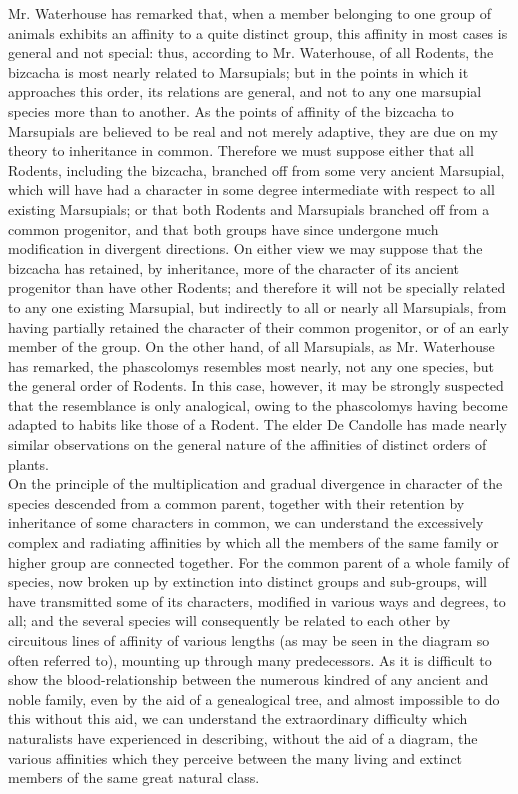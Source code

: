 \indent Mr. Waterhouse has remarked that, when a member belonging to one group of animals exhibits an affinity to a quite distinct group, this affinity in most cases is general and not special: thus, according to Mr. Waterhouse, of all Rodents, the bizcacha is most nearly related to Marsupials; but in the points in which it approaches this order, its relations are general, and not to any one marsupial species more than to another. As the points of affinity of the bizcacha to Marsupials are believed to be real and not merely adaptive, they are due on my theory to inheritance in common. Therefore we must suppose either that all Rodents, including the bizcacha, branched off from some very ancient Marsupial, which will have had a character in some degree intermediate with respect to all existing Marsupials; or that both Rodents and Marsupials branched off from a common progenitor, and that both groups have since undergone much modification in divergent directions. On either view we may suppose that the bizcacha has retained, by inheritance, more of the character of its ancient progenitor than have other Rodents; and therefore it will not be specially related to any one existing Marsupial, but indirectly to all or nearly all Marsupials, from having partially retained the character of their common progenitor, or of an early member of the group. On the other hand, of all Marsupials, as Mr. Waterhouse has remarked, the phascolomys resembles most nearly, not any one species, but the general order of Rodents. In this case, however, it may be strongly suspected that the resemblance is only analogical, owing to the phascolomys having become adapted to habits like those of a Rodent. The elder De Candolle has made nearly similar observations on the general nature of the affinities of distinct orders of plants.~\\
\indent On the principle of the multiplication and gradual divergence in character of the species descended from a common parent, together with their retention by inheritance of some characters in common, we can understand the excessively complex and radiating affinities by which all the members of the same family or higher group are connected together. For the common parent of a whole family of species, now broken up by extinction into distinct groups and sub-groups, will have transmitted some of its characters, modified in various ways and degrees, to all; and the several species will consequently be related to each other by circuitous lines of affinity of various lengths (as may be seen in the diagram so often referred to), mounting up through many predecessors. As it is difficult to show the blood-relationship between the numerous kindred of any ancient and noble family, even by the aid of a genealogical tree, and almost impossible to do this without this aid, we can understand the extraordinary difficulty which naturalists have experienced in describing, without the aid of a diagram, the various affinities which they perceive between the many living and extinct members of the same great natural class.~\\
